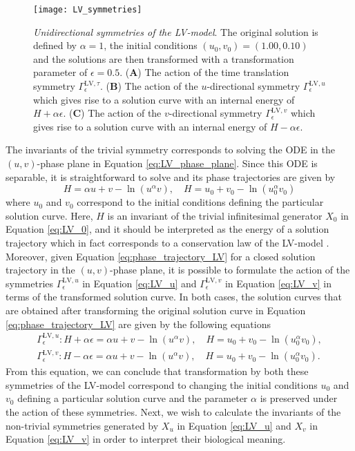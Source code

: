 \begin{figure}[htbp!]
  \begin{center}
\texttt{[image: LV\_symmetries]}
\caption{\textit{Unidirectional symmetries of the LV-model}. The original solution is defined by $\alpha=1$, the initial conditions $(u_0,v_0)=(1.00,0.10)$ and the solutions are then transformed with a transformation parameter of $\epsilon=0.5$. (\textbf{A}) The action of the time translation symmetry $\Gamma^{\mathrm{LV},\tau}_{\epsilon}$. (\textbf{B}) The action of the $u$-directional symmetry $\Gamma^{\mathrm{LV},u}_{\epsilon}$ which gives rise to a solution curve with an internal energy of $H+\alpha\epsilon$. (\textbf{C}) The action of the $v$-directional symmetry $\Gamma^{\mathrm{LV},v}_{\epsilon}$ which gives rise to a solution curve with an internal energy of $H-\alpha\epsilon$.}
\label{fig:LV_symmetries}
\end{center}
\end{figure}

The invariants of the trivial symmetry corresponds to solving the ODE in the $(u,v)$-phase plane in Equation \eqref{eq:LV_phase_plane}. Since this ODE is separable, it is straightforward to solve and its phase trajectories are given by \cite{murray2002}
\begin{equation}
  H=\alpha u+v-\ln\left(u^\alpha v\right),\quad H=u_0+v_0-\ln\left(u_0^\alpha v_0\right)
  \label{eq:phase_trajectory_LV}
\end{equation}
where $u_0$ and $v_0$ correspond to the initial conditions defining the particular solution curve. Here, $H$ is an invariant of the trivial infinitesimal generator $X_0$ in Equation \eqref{eq:LV_0}, and it should be interpreted as the energy of a solution trajectory which in fact corresponds to a conservation law of the LV-model \cite{murray2002}. Moreover, given Equation \eqref{eq:phase_trajectory_LV} for a closed solution trajectory in the $(u,v)$-phase plane, it is possible to formulate the action of the symmetries $\Gamma^{\mathrm{LV},u}_\epsilon$ in Equation \eqref{eq:LV_u} and $\Gamma^{\mathrm{LV},v}_\epsilon$ in Equation \eqref{eq:LV_v} in terms of the transformed solution curve. In both cases, the solution curves that are obtained after transforming the original solution curve in Equation \eqref{eq:phase_trajectory_LV} are given by the following equations
\begin{align}
  \Gamma_{\epsilon}^{\mathrm{LV},u}:H+\alpha\epsilon=\alpha u+v-\ln\left(u^\alpha v\right),\quad H=u_0+v_0-\ln\left(u_0^\alpha v_0\right),\label{eq:trans_LV_u}\\
  \Gamma_{\epsilon}^{\mathrm{LV},v}:H-\alpha\epsilon=\alpha u+v-\ln\left(u^\alpha v\right),\quad H=u_0+v_0-\ln\left(u_0^\alpha v_0\right).\label{eq:trans_LV_v}
\end{align}
From this equation, we can conclude that transformation by both these symmetries of the LV-model correspond to changing the initial conditions $u_0$ and $v_0$ defining a particular solution curve and the parameter $\alpha$ is preserved under the action of these symmetries. Next, we wish to calculate the invariants of the non-trivial symmetries generated by $X_u$ in Equation \eqref{eq:LV_u} and $X_v$ in Equation \eqref{eq:LV_v} in order to interpret their biological meaning.


